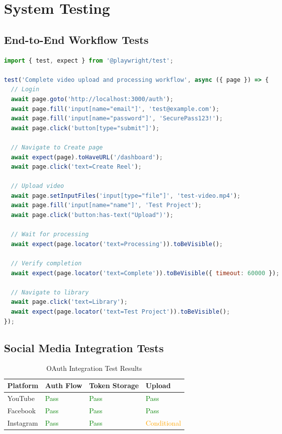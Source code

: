 \section{System Testing}

\subsection{End-to-End Workflow Tests}

\begin{lstlisting}[language=JavaScript, caption=E2E Upload Workflow Test]
import { test, expect } from '@playwright/test';

test('Complete video upload and processing workflow', async ({ page }) => {
  // Login
  await page.goto('http://localhost:3000/auth');
  await page.fill('input[name="email"]', 'test@example.com');
  await page.fill('input[name="password"]', 'SecurePass123!');
  await page.click('button[type="submit"]');
  
  // Navigate to Create page
  await expect(page).toHaveURL('/dashboard');
  await page.click('text=Create Reel');
  
  // Upload video
  await page.setInputFiles('input[type="file"]', 'test-video.mp4');
  await page.fill('input[name="name"]', 'Test Project');
  await page.click('button:has-text("Upload")');
  
  // Wait for processing
  await expect(page.locator('text=Processing')).toBeVisible();
  
  // Verify completion
  await expect(page.locator('text=Complete')).toBeVisible({ timeout: 60000 });
  
  // Navigate to library
  await page.click('text=Library');
  await expect(page.locator('text=Test Project')).toBeVisible();
});
\end{lstlisting}

\subsection{Social Media Integration Tests}

\begin{table}[H]
\centering
\caption{OAuth Integration Test Results}
\begin{tabular}{@{}llll@{}}
\toprule
\textbf{Platform} & \textbf{Auth Flow} & \textbf{Token Storage} & \textbf{Upload} \\
\midrule
YouTube & \textcolor{green}{Pass} & \textcolor{green}{Pass} & \textcolor{green}{Pass} \\
Facebook & \textcolor{green}{Pass} & \textcolor{green}{Pass} & \textcolor{green}{Pass} \\
Instagram & \textcolor{green}{Pass} & \textcolor{green}{Pass} & \textcolor{orange}{Conditional} \\
\bottomrule
\end{tabular}
\end{table}

